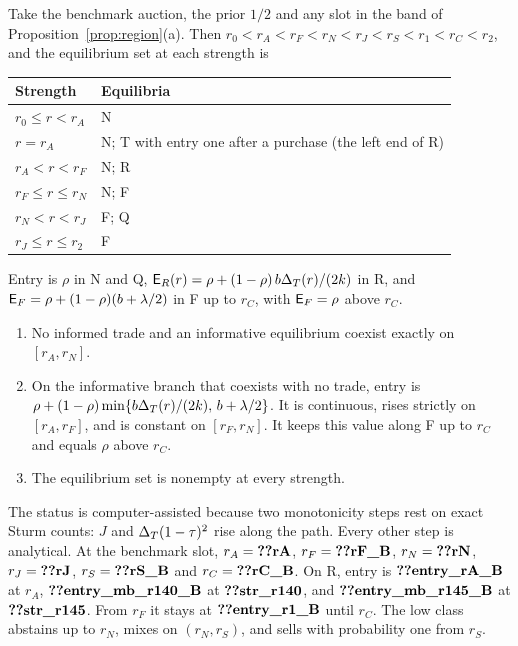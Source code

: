 \begin{proposition}\label{prop:coexistence}
Take the benchmark auction, the prior \(1/2\) and any slot in the band of Proposition~\ref{prop:region}(a). Then
\(r_0<r_A<r_F<r_N<r_J<r_S<r_1<r_C<r_2\), and the equilibrium set at each strength is
\begin{center}
\begin{tabular}{@{}ll@{}}
\toprule
Strength & Equilibria\\
\midrule
\(r_0\le r<r_A\) & N\\
\(r=r_A\) & N; T with entry one after a purchase (the left end of R)\\
\(r_A<r<r_F\) & N; R\\
\(r_F\le r\le r_N\) & N; F\\
\(r_N<r<r_J\) & F; Q\\
\(r_J\le r\le r_2\) & F\\
\bottomrule
\end{tabular}
\end{center}
Entry is \(\rho\) in N and Q, \(\mathsf{E}_R(r)=\rho+(1-\rho)\,b\Delta_T(r)/(2k)\) in R, and
\(\mathsf{E}_F=\rho+(1-\rho)(b+\lambda/2)\) in F up to \(r_C\), with \(\mathsf{E}_F=\rho\) above \(r_C\).
\begin{enumerate}[label=(\alph*),leftmargin=2em]
\item No informed trade and an informative equilibrium coexist exactly on \([r_A,r_N]\).
\item On the informative branch that coexists with no trade, entry is
\(\rho+(1-\rho)\min\{b\Delta_T(r)/(2k),\,b+\lambda/2\}\). It is continuous, rises strictly on \([r_A,r_F]\), and is
constant on \([r_F,r_N]\). It keeps this value along F up to \(r_C\) and equals \(\rho\) above \(r_C\).
\item The equilibrium set is nonempty at every strength.
\end{enumerate}
\end{proposition}

The status is computer-assisted because two monotonicity steps rest on exact Sturm counts: \(J\) and
\(\Delta_T(1-\tau)^2\) rise along the path. Every other step is analytical. At the benchmark slot,
\(r_A=\reg{rA}\), \(r_F=\reg{rF_B}\), \(r_N=\reg{rN}\), \(r_J=\reg{rJ}\), \(r_S=\reg{rS_B}\) and
\(r_C=\reg{rC_B}\). On R, entry is \(\reg{entry_rA_B}\) at \(r_A\), \(\reg{entry_mb_r140_B}\) at
\(\reg{str_r140}\), and \(\reg{entry_mb_r145_B}\) at \(\reg{str_r145}\). From \(r_F\) it stays at
\(\reg{entry_r1_B}\) until \(r_C\). The low class abstains up to \(r_N\), mixes on \((r_N,r_S)\), and sells with
probability one from \(r_S\).

